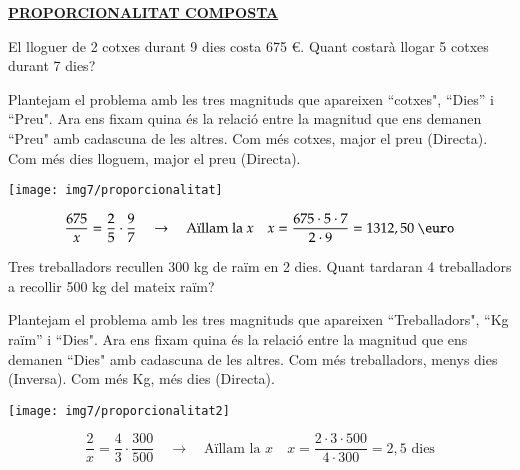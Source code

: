 \documentclass{article}
\newcommand{\vs}{\vspace{0cm}}
\begin{document}
 
\begin{center}
\underline{\textbf{\large PROPORCIONALITAT COMPOSTA}}

\end{center}
	
	\begin{mylist}
		\item El lloguer de 2 cotxes durant 9
		dies costa 675 \euro{}. Quant costarà llogar 5 cotxes durant 7 dies?
		\begin{example}
			
			\begin{minipage}{0.6\textwidth}
					Plantejam el problema amb les tres magnituds que apareixen ``cotxes", ``Dies'' i ``Preu". 
				Ara ens fixam quina és la relació entre la magnitud que ens demanen ``Preu" amb cadascuna de les altres.
				Com més cotxes, major el preu (Directa). Com més dies lloguem, major el preu (Directa).
				  
			\end{minipage}
			\begin{minipage}{0.4\textwidth}
				\centering
					\texttt{[image: img7/proporcionalitat]}
			\end{minipage}
		
		\[ \frac{675}{x} = \frac{2}{5} \cdot \frac{9}{7} \quad \rightarrow \quad \text{Aïllam la }x \quad x=\frac{675\cdot 5 \cdot 7}{2\cdot 9}= 1312,50 \text{ \euro}  \]
		\end{example}
		\vs\vs\vs
		\item Tres treballadors recullen 300 kg de raïm en 2 dies. Quant tardaran 4 treballadors a recollir 500 kg del mateix raïm?
			\begin{example}
			
			\begin{minipage}{0.6\textwidth}
				Plantejam el problema amb les tres magnituds que apareixen ``Treballadors", ``Kg raïm'' i ``Dies". 
				Ara ens fixam quina és la relació entre la magnitud que ens demanen ``Dies" amb cadascuna de les altres.
				Com més treballadors, menys dies (Inversa). Com més Kg, més dies (Directa).
				
			\end{minipage}
			\begin{minipage}{0.4\textwidth}
				\centering
				\texttt{[image: img7/proporcionalitat2]}
			\end{minipage}
			
			\[ \frac{2}{x} = \boxed{ \frac{4}{3} } \cdot \frac{300}{500} \quad \rightarrow \quad \text{Aïllam la }x \quad x=\frac{2\cdot 3 \cdot 500}{4\cdot 300}= 2,5 \text{ dies}  \]
			

\end{example}
\end{mylist}
\end{document}
